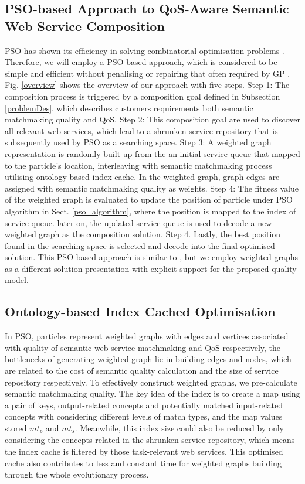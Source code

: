 \documentclass{IEEEtran}
\begin{document}
\subsection{PSO-based Approach to QoS-Aware Semantic Web Service Composition}

PSO has shown its efficiency in solving combinatorial optimisation problems \cite{fukuyama2008fundamentals}. Therefore, we will employ a PSO-based approach, which is considered to be simple and efficient without penalising or repairing that often required by GP \cite{da2016particle}. Fig. \ref{overview} shows the overview of our approach with five steps. Step 1: The composition process is triggered by a composition goal defined in Subsection \ref{problemDes}, which describes customers requirements both semantic matchmaking quality and QoS. Step 2: This composition goal are used to discover all relevant web services, which lead to a shrunken service repository that is subsequently used by PSO as a searching space. Step 3: A weighted graph representation is randomly built up from the an initial service queue that mapped to the particle's location, interleaving with semantic matchmaking process utilising ontology-based index cache. In the weighted graph, graph edges are assigned with semantic matchmaking quality as weights. Step 4: The fitness value of the weighted graph is evaluated to update the position of particle under PSO algorithm in Sect. \ref{pso_algorithm}, where the position is mapped to the index of service queue. later on, the updated service queue is used to decode a new weighted graph as the composition solution. Step 4. Lastly, the best position found in the searching space is selected and decode into the final optimised solution. This PSO-based approach is similar to \cite{da2016particle}, but we employ weighted graphs as a different solution presentation with explicit support for the proposed quality model.


\subsection{Ontology-based Index Cached Optimisation}\label{indexCache}
In PSO, particles represent weighted graphs with edges and vertices associated with quality of semantic web service matchmaking and QoS respectively, the bottlenecks of generating weighted graph lie in building edges and nodes, which are related to the cost of semantic quality calculation and the size of service repository respectively. To effectively construct weighted graphs, we pre-calculate semantic matchmaking quality. The key idea of the index is to create a map using a pair of keys, output-related concepts and potentially matched input-related concepts with considering different levels of match types, and the map values stored $mt_{p}$ and $mt_{s}$. Meanwhile, this index size could also be reduced by only considering the concepts related in the shrunken service repository, which means the index cache is filtered by those task-relevant web services. This optimised cache also contributes to less and constant time for weighted graphs building through the whole evolutionary process.
\end{document}
